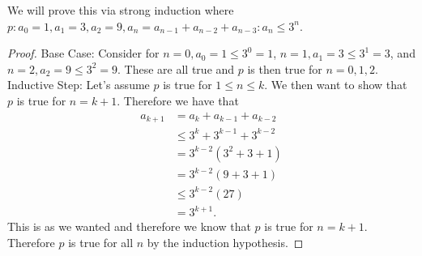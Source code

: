 \documentclass{article}
\begin{document}
\begin{enumerate}
    We will prove this via strong induction where $p: a_0=1, a_1=3, a_2 = 9, a_n = a_{n-1} + a_{n-2} + a_{n-3}: a_n \leq 3^n$.
    \begin{proof}
    Base Case: Consider for $n = 0, a_0 = 1 \leq 3^0 = 1$, $n=1, a_1 = 3 \leq 3^1 = 3$, and $n=2, a_2 = 9\leq 3^2 = 9$. These are all true and $p$ is then true for $n=0, 1, 2.$\\
    Inductive Step: Let's assume $p$ is true for $1\leq n\leq k$. We then want to show that $p$ is true for $n=k+1$. Therefore we have that
    \begin{align*}
        a_{k+1} &= a_k + a_{k-1} + a_{k-2}\\
        &\leq 3^{k} + 3^{k-1} + 3^{k-2}\\
        &= 3^{k-2}(3^2 + 3 + 1)\\
        &= 3^{k-2}(9+3+1)\\
        &\leq 3^{k-2}(27)\\
        &= 3^{k+1}.
    \end{align*} This is as we wanted and therefore we know that $p$ is true for $n=k+1$. Therefore $p$ is true for all $n$ by the induction hypothesis.
    \end{proof}
    
\end{enumerate}
\end{document}
